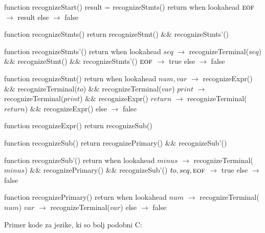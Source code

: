 \documentclass{report}
\newcommand{\EOF}{\textsc{eof}}
\newlength{\arrow}
\newcommand{\T}[1]{{#1}}
\begin{document}
\begin{algorithm}
  function recognizeStart()
    result = recognizeStmts()
    return when lookahead
      $\EOF$ $\rightarrow$ result
      else $\rightarrow$ false

  function recognizeStmts()
    return recognizeStmt() $\&\&$ recognizeStmts'()

  function recognizeStmts'()
    return when lookahead
      $\T{seq}$ $\rightarrow$ recognizeTerminal($\T{seq}$) $\&\&$ recognizeStmt() $\&\&$ recognizeStmts'()
      $\EOF$ $\rightarrow$ true
      else $\rightarrow$ false

  function recognizeStmt()
    return when lookahead
      $\T{num}, \T{var}$ $\rightarrow$ recognizeExpr() $\&\&$ recognizeTerminal($\T{to}$) $\&\&$ recognizeTerminal($\T{var}$)
      $\T{print}$ $\rightarrow$ recognizeTerminal($\T{print}$) $\&\&$ recognizeExpr()
      $\T{return}$ $\rightarrow$ recognizeTerminal($\T{return}$) $\&\&$ recognizeExpr()
      else $\rightarrow$ false

  function recognizeExpr()
    return recognizeSub()

  function recognizeSub()
    return recognizePrimary() $\&\&$ recognizeSub'()

  function recognizeSub'()
    return when lookahead
      $\T{minus}$ $\rightarrow$ recognizeTerminal($\T{minus}$) $\&\&$ recognizePrimary() $\&\&$  recognizeSub'()
      $\T{to}, \T{seq}, \EOF$ $\rightarrow$ true
      else $\rightarrow$ false

  function recognizePrimary()
    return when lookahead
      $\T{num}$ $\rightarrow$ recognizeTerminal($\T{num}$)
      $\T{var}$ $\rightarrow$ recognizeTerminal($\T{var}$)
      else $\rightarrow$ false
\end{algorithm}

\newpage
Primer kode za jezike, ki so bolj podobni C:
\end{document}
